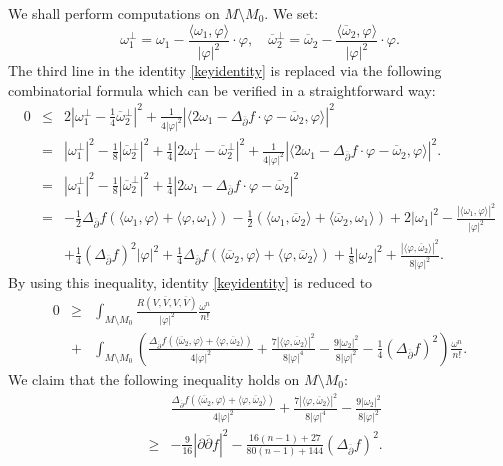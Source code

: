 \documentclass[12pt, reqno]{amsart}
\newcommand\bp{{\bar\partial}}
\theoremstyle{plain}
\theoremstyle{definition}
\newcommand{\p}{\partial}
\renewcommand{\bar}{\overline}
\renewcommand{\phi}{\varphi}
\newcommand{\beq}{\begin{equation}}
\newcommand{\eeq}{\end{equation}}
\newcommand{\ee}{\end{eqnarray*}}
\newcommand{\be}{\begin{eqnarray*}}
\renewcommand{\bp}{\bar{\partial}}
\renewcommand{\>}{\rightarrow}
\renewcommand{\#}{\sharp}
\numberwithin{equation}{section} %
\begin{document}
\noindent
We shall perform computations on $M\setminus M_0$. We set:
\beq \omega_1^{\perp} = \omega_1 - \frac{\langle \omega_1,\phi \rangle}{|\phi|^2}\cdot \phi, \quad \bar\omega{}_2^{\perp} = \bar\omega_2 - \frac{\langle \bar\omega_2,\phi \rangle}{|\phi|^2}\cdot \phi. \eeq
 The third line in the identity \eqref{keyidentity} is replaced via the following combinatorial formula which can be verified in a straightforward way:
\be 0 & \leq & 2\left|\omega_1^\perp - \frac{1}{4}\bar\omega{}_2^\perp \right|^2 + \frac{1}{4|\phi|^2}\left|\langle 2\omega_1 - \Delta_{\bar\p}f\cdot\phi - \bar\omega_2,\phi \rangle \right|^2 \\
& = & |\omega_1^\perp|^2 - \frac{1}{8}|\bar\omega{}_2^\perp|^2 + \frac{1}{4}|2\omega_1^\perp - \bar\omega{}_2^\perp|^2 +  \frac{1}{4|\phi|^2}\left|\langle 2\omega_1 - \Delta_{\bar\p}f\cdot\phi - \bar\omega_2,\phi \rangle \right|^2. \\
& = & |\omega_1^\perp|^2 - \frac{1}{8}|\bar\omega_2^\perp|^2 + \frac{1}{4}\left| 2\omega_1 -\Delta_{\bar\p} f\cdot \phi -\bar\omega_2 \right|^2 \\
& = & - \frac{1}{2}\Delta_{\bar \p}f \left(\langle \omega_1,\phi \rangle + \langle \phi, \omega_1 \rangle \right) - \frac{1}{2} \left(\langle \omega_1,\bar\omega_2 \rangle + \langle \bar\omega_2, \omega_1 \rangle \right) + 2|\omega_1|^2 - \frac{|\langle \omega_1, \phi \rangle|^2}{|\phi|^2} \\
&& + \frac{1}{4}(\Delta_{\bar\p}f)^2|\phi|^2 + \frac{1}{4}\Delta_{\bar \p}f \left(\langle \bar\omega_2,\phi \rangle + \langle \phi, \bar\omega_2 \rangle \right) + \frac{1}{8}|\omega_2|^2 + \frac{|\langle \phi,\bar\omega_2\rangle|^2}{8|\phi|^2}. \ee
By using this inequality,  identity \eqref{keyidentity} is reduced to
\begin{eqnarray} 0 &\geq& \int_{M\setminus M_0} \frac{R(V,\bar V,V,\bar V)}{|\phi|^2} \frac{\omega^n}{n!} \label{key4}\\ \nonumber&+& \int_{M\setminus M_0} \left(\frac{\Delta_{\bar \p}f \left(\langle \bar\omega_2,\phi \rangle + \langle \phi, \bar\omega_2 \rangle \right)}{4|\phi|^2}+  \frac{7|\langle \phi, \bar\omega_2\rangle|^2}{8|\phi|^4}  - \frac{9|\omega_2|^2}{8|\phi|^2} -\frac{1}{4}(\Delta_{\bar\p} f)^2 \right) \frac{\omega^n}{n!}. \end{eqnarray}
We claim that the following inequality holds on $M\setminus M_0$:
\begin{eqnarray} \nonumber&&\frac{\Delta_{\bar \p}f \left(\langle \bar\omega_2,\phi \rangle + \langle \phi, \bar\omega_2 \rangle \right)}{4|\phi|^2}+  \frac{7|\langle \phi, \bar\omega_2\rangle|^2}{8|\phi|^4}  - \frac{9|\omega_2|^2}{8|\phi|^2}\\&\geq& -\frac{9}{16}|\p\bp f|^2-\frac{16(n-1)+27}{80(n-1)+144}(\Delta_{\bp} f)^2.\label{claim}\end{eqnarray} 
\end{document}
